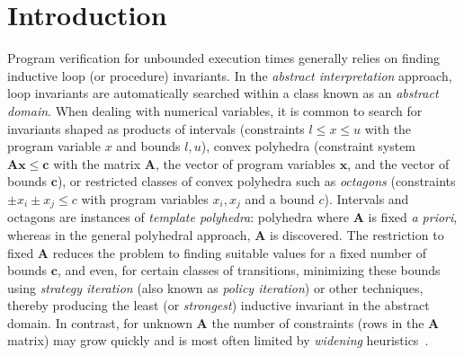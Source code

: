 \documentclass{llncs}
\newcommand{\rronly}[1]{#1}
\newcommand{\sleq}{\!\leq\!}
\newcommand{\mat}[1]{{\boldsymbol #1}}
\renewcommand{\vec}[1]{{\boldsymbol #1}}
\begin{document}
\section{Introduction}
Program verification for unbounded execution times generally relies on
finding inductive loop (or procedure) invariants. In the
\emph{abstract interpretation} approach, loop invariants are
automatically searched within a class known as an \emph{abstract
  domain}. When dealing with numerical variables, it is common to
search for invariants shaped as products of intervals (constraints $l
\sleq x \sleq u$ with the program variable $x$ and bounds $l,u$),
convex polyhedra (constraint system $\mat{A}\vec{x} \sleq \vec{c}$
with the matrix $\mat{A}$, the vector of program variables $\vec{x}$,
and the vector of bounds $\vec{c}$), or restricted classes of convex
polyhedra such as \emph{octagons} (\rronly{constraints }$\pm x_i \pm x_j \sleq c$\rronly{ with program variables $x_i,x_j$ and a bound $c$}). Intervals and octagons
are instances of \emph{template polyhedra}: polyhedra where $\mat{A}$
is fixed \emph{a priori}, whereas in the general polyhedral approach,
$\mat{A}$ is discovered.  The restriction to fixed $\mat{A}$ reduces
the problem to finding suitable values for a fixed number of bounds
$\vec{c}$, and even, for certain classes of transitions, minimizing
these bounds using \emph{strategy iteration}
\cite{Gawlitza_Monniaux_LMCS12} (also known as \emph{policy
  iteration}) or other techniques, thereby producing the least (or
\emph{strongest}) inductive invariant in the abstract domain. In
contrast, for unknown $\mat{A}$ the number of constraints (rows in
the $\mat{A}$ matrix) may grow quickly and is most often limited by
\emph{widening} heuristics~\cite{DBLP:journals/fmsd/HalbwachsPR97}.
\end{document}
